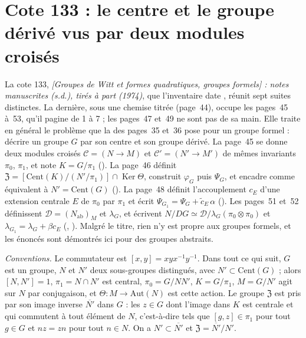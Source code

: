\section[Cote 133 : le centre et le groupe dérivé vus par deux modules croisés]{Cote 133 : le centre et le groupe dérivé vus par deux modules croisés\protect{}}\label{sec:133}

La cote 133, \emph{[Groupes de Witt et formes quadratiques, groupes formels] : notes manuscrites (s.d.), tirés à part (1974)}, que l'inventaire date , réunit sept suites distinctes. La dernière, sous une chemise titrée  (page~44), occupe les pages~45 à~53, qu'il pagine de 1 à 7 ; les pages~47 et~49 ne sont pas de sa main. Elle traite en général le problème que la  des pages~35 et~36 pose pour un groupe formel : décrire un groupe $G$ par son centre et son groupe dérivé. La page~45 se donne deux modules croisés $\mathcal C = (N \to M)$ et $\mathcal C' = (N' \to M')$ de mêmes invariants $\pi_0$, $\pi_1$, et note $K = G/\pi_1$ (). La page~46 définit $\mathfrak Z = [\mathrm{Cent}(K)/(N'/\pi_1)] \cap \operatorname{Ker}\Theta$, construit $\varphi_G$ puis $\Psi_G$, et encadre  comme équivalent à $N' = \mathrm{Cent}(G)$ (). La page~48 définit l'accouplement $c_E$ d'une extension centrale $E$ de $\pi_0$ par $\pi_1$ et écrit  $\Psi_{G_1} = \Psi_G + \tilde c_E\,\alpha$ (). Les pages~51 et~52 définissent $\mathcal D = (N_{\mathrm{ab}})_M$ et $\lambda_G$, et écrivent $N/DG \simeq \mathcal D/\lambda_G(\pi_0 \otimes \pi_0)$ et $\lambda_{G_1} = \lambda_G + \beta c_E$ (, ). Malgré le titre, rien n'y est propre aux groupes formels, et les énoncés sont démontrés ici pour des groupes abstraits.

\noindent\emph{Conventions.} Le commutateur est $[x, y] = xyx^{-1}y^{-1}$. Dans tout ce qui suit, $G$ est un groupe, $N$ et $N'$ deux sous-groupes distingués, avec $N' \subset \mathrm{Cent}(G)$ ; alors $[N, N'] = 1$, $\pi_1 = N \cap N'$ est central, $\pi_0 = G/NN'$, $K = G/\pi_1$, $M = G/N'$ agit sur $N$ par conjugaison, et $\Theta : M \to \mathrm{Aut}(N)$ est cette action. Le groupe $\mathfrak Z$ est pris par son image inverse $\overline{N'}$ dans $G$ : les $z \in G$ dont l'image dans $K$ est centrale et qui commutent à tout élément de $N$, c'est-à-dire tels que $[g, z] \in \pi_1$ pour tout $g \in G$ et $nz = zn$ pour tout $n \in N$. On a $N' \subset \overline{N'}$ et $\mathfrak Z = \overline{N'}/N'$.

